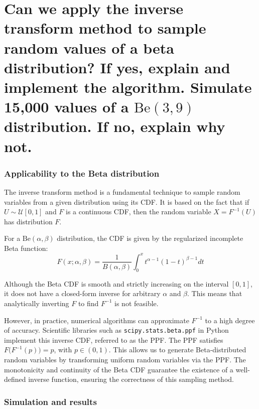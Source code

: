 \newpage


\section{Can we apply the inverse transform method to sample random values of a beta distribution? If yes, explain and implement the algorithm. Simulate 15,000 values of a $\text{Be}(3, 9)$ distribution. If no, explain why not.}

\subsubsection*{Applicability to the Beta distribution}

The inverse transform method is a fundamental technique to sample random variables from a given distribution using its CDF. It is based on the fact that if \( U \sim \mathcal{U}[0, 1] \) and \( F \) is a continuous CDF, then the random variable $X = F^{-1}(U)$ has distribution \( F \).

For a \(\text{Be}(\alpha, \beta)\) distribution, the CDF is given by the regularized incomplete Beta function:
\begin{equation}
F(x; \alpha, \beta) = \frac{1}{B(\alpha, \beta)} \int_0^x t^{\alpha - 1}(1 - t)^{\beta - 1} dt
\end{equation}

Although the Beta CDF is smooth and strictly increasing on the interval \([0,1]\), it does not have a closed-form inverse for arbitrary \(\alpha\) and \(\beta\). This means that analytically inverting \(F\) to find \(F^{-1}\) is not feasible.

However, in practice, numerical algorithms can approximate \(F^{-1}\) to a high degree of accuracy. Scientific libraries such as \texttt{scipy.stats.beta.ppf} in Python implement this inverse CDF, referred to as the PPF. The PPF satisfies $F\big(F^{-1}(p)\big) = p$, with $p \in (0,1)$. This allows us to generate Beta-distributed random variables by transforming uniform random variables via the PPF. The monotonicity and continuity of the Beta CDF guarantee the existence of a well-defined inverse function, ensuring the correctness of this sampling method.

\subsubsection*{Simulation and results}


